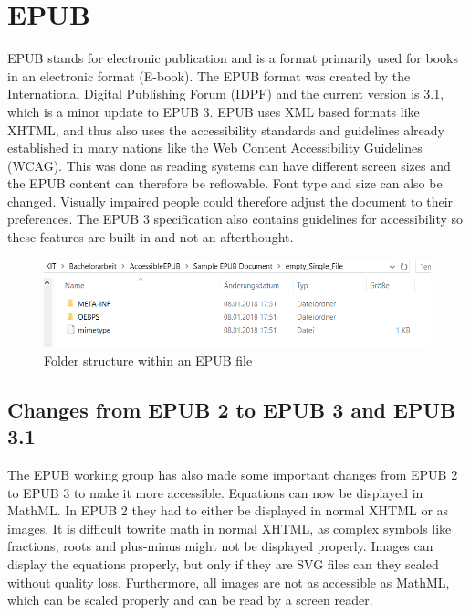 \section{EPUB}
EPUB stands for electronic publication and is a format primarily used for books in an electronic format (E-book). The EPUB format was created by the International Digital Publishing Forum (IDPF) and the current version is 3.1, which is a minor update to EPUB 3.\cite{EPUBspecs} EPUB uses XML based formats  like XHTML, and thus also uses the accessibility standards and guidelines already established in many nations like the Web Content Accessibility Guidelines (WCAG). \cite{WCAG} This was done as reading systems can have different screen sizes and the EPUB content can therefore be reflowable. Font type and size can also be changed. Visually impaired people could therefore adjust the document to their preferences. The EPUB 3 specification also contains guidelines for accessibility so these features are built in and not an afterthought.\cite{EPUB3bp}


\begin{figure}
	\includegraphics[width=\linewidth]{figures/epubFolderStructure.png}
	\caption{Folder structure within an EPUB file}
	\label{fig:epubFolderStructure}
\end{figure}

\subsection{Changes from EPUB 2 to EPUB 3 and EPUB 3.1}

The EPUB working group has also made some important changes from EPUB 2 to EPUB 3  to make it more accessible. Equations can now be displayed in MathML.\cite{EPUB30changes} In EPUB 2 they had to either be displayed in normal XHTML or as images. It is difficult towrite math in normal XHTML, as complex symbols like fractions, roots and plus-minus might not be displayed properly. Images can display the equations properly, but only if they are SVG files can they scaled without quality loss. Furthermore, all images are not as accessible as MathML, which can be scaled properly and can be read by a screen reader.

